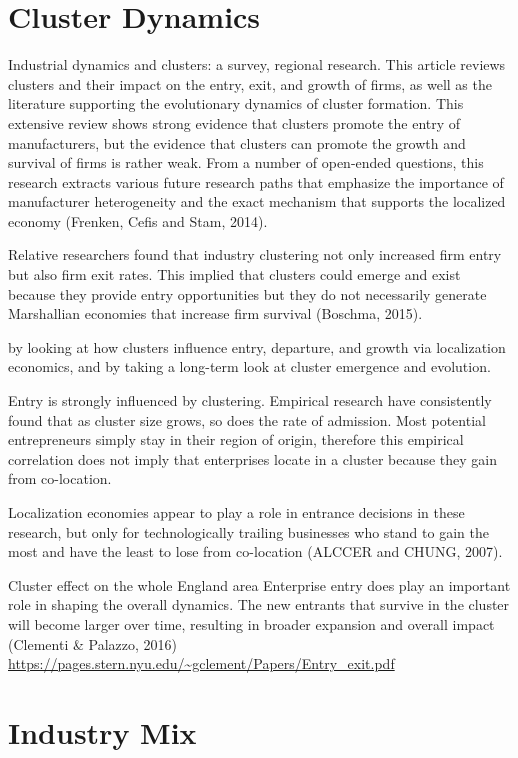 \documentclass[
  12pt,
  oneside]{book}
\begin{document}
\hypertarget{cluster-dynamics}{%
\section{Cluster Dynamics}\label{cluster-dynamics}}

Industrial dynamics and clusters: a survey, regional research. This article reviews clusters and their impact on the entry, exit, and growth of firms, as well as the literature supporting the evolutionary dynamics of cluster formation. This extensive review shows strong evidence that clusters promote the entry of manufacturers, but the evidence that clusters can promote the growth and survival of firms is rather weak. From a number of open-ended questions, this research extracts various future research paths that emphasize the importance of manufacturer heterogeneity and the exact mechanism that supports the localized economy (Frenken, Cefis and Stam, 2014).

Relative researchers found that industry clustering not only increased firm entry but also firm exit rates. This implied that clusters could emerge and exist because they provide entry opportunities but they do not necessarily generate Marshallian economies that increase firm survival (Boschma, 2015).

by looking at how clusters influence entry, departure, and growth via localization economics, and by taking a long-term look at cluster emergence and evolution.

Entry is strongly influenced by clustering. Empirical research have consistently found that as cluster size grows, so does the rate of admission. Most potential entrepreneurs simply stay in their region of origin, therefore this empirical correlation does not imply that enterprises locate in a cluster because they gain from co-location.

Localization economies appear to play a role in entrance decisions in these research, but only for technologically trailing businesses who stand to gain the most and have the least to lose from co-location (ALCCER and CHUNG, 2007).

Cluster effect on the whole England area
Enterprise entry does play an important role in shaping the overall dynamics. The new entrants that survive in the cluster will become larger over time, resulting in broader expansion and overall impact (Clementi \& Palazzo, 2016)
\url{https://pages.stern.nyu.edu/~gclement/Papers/Entry_exit.pdf}

\hypertarget{industry-mix}{%
\section{Industry Mix}\label{industry-mix}}
\end{document}
